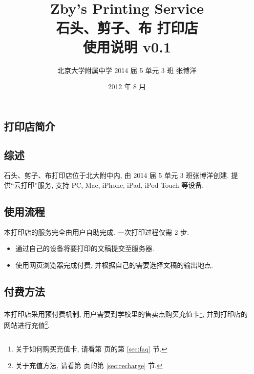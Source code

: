 \documentclass{article}
\begin{document}
\begin{CJK}{UTF8}{gbsn}
\title{~\\[3cm]Zby's Printing Service\\石头、剪子、布 打印店\\使用说明 v0.1}
\author{北京大学附属中学 2014 届 5 单元 3 班 张博洋}
\date{2012 年 8 月}
\maketitle
\thispagestyle{empty}
\newpage
\renewcommand\contentsname{目\quad 录}
\renewcommand\figurename{图}
\renewcommand\tablename{表}
\newcommand{\zwfs}[2]{\frac{\;#1\;}{\;#2\;}}
\tableofcontents
\thispagestyle{empty}
\newpage
{}
\CJKindent

\section{打印店简介}
	\subsection{综述}
		石头、剪子、布打印店位于北大附中内, 由 2014 届 5 单元 3 班张博洋创建. 提供``云打印''服务, 支持 PC, Mac, iPhone, iPad, iPod Touch 等设备.
		
	\subsection{使用流程}
		本打印店的服务完全由用户自助完成. 一次打印过程仅需 2 步.
		\begin{itemize}
			\item{通过自己的设备将要打印的文稿提交至服务器.}
			\item{使用网页浏览器完成付费, 并根据自己的需要选择文稿的输出地点.}
		\end{itemize}
	
	\subsection{付费方法}
		本打印店采用预付费机制, 用户需要到学校里的售卖点购买充值卡\footnote{关于如何购买充值卡, 请看第 \pageref{sec:faq} 页的第 \ref{sec:faq} 节.}, 并到打印店的网站进行充值\footnote{关于充值方法, 请看第 \pageref{sec:recharge} 页的第 \ref{sec:recharge} 节.}.

\end{CJK}
\end{document}
